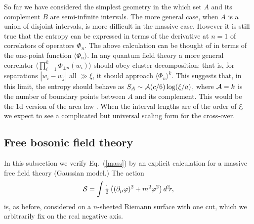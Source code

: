 \documentclass[12pt,aps,nofootinbib]{revtex4-1}
\def\ffrac#1#2{\textstyle{#1\over#2}\displaystyle}
\begin{document}
So far we have considered the simplest geometry in the which set $A$ and
its complement $B$ are semi-infinite intervals. The more general case,
when $A$ is a union of disjoint intervals, is more difficult in the
massive case. However it is still true that the entropy can be expressed
in terms of the derivative at $n=1$ of correlators of operators
$\Phi_n$. The above calculation can be thought of in terms of the
one-point function $\langle\Phi_n\rangle$. In any quantum field theory
a more general correlator
$\langle\prod_{i=1}^{k}\Phi_{\pm n}(w_i)\rangle$ should obey cluster
decomposition: that is, for separations $|w_i-w_j|$ all $\gg\xi$, it
should approach $\langle\Phi_n\rangle^{k}$. This suggests that, in this
limit, the entropy should behave as $S_A\sim{\cal A}(c/6)\log(\xi/a)$,
where ${\cal A}=k$ is the number of boundary points between $A$ and its
complement. This would be the 1d version of the area
law \cite{s-93}. When the interval lengths are of the order of
$\xi$, we expect to see a complicated but universal scaling form for the
cross-over.


\def\be{\begin{equation}}
\def\ee{\end{equation}}

\def\bea{\begin{eqnarray}}
\def\eea{\end{eqnarray}}

\def\e{\epsilon}

\subsection{Free bosonic field theory}

In this subsection we verify Eq.~(\ref{mass}) by an explicit calculation for a
massive free field theory (Gaussian model.)
The action
\be
{\cal S}=\int \ffrac12
\left((\partial_\mu\varphi)^2+m^2\varphi^2\right)d^2\!r,
\ee
is, as before,
considered on a $n$-sheeted Riemann surface with one cut, which we
arbitrarily fix on the real negative axis.
\end{document}
